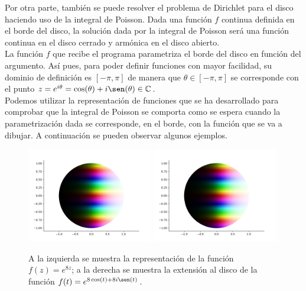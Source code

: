 Por otra parte, también se puede resolver el problema de Dirichlet para el disco haciendo uso de la integral de Poisson. Dada una función $f$ continua definida en el borde del disco, la solución dada por la integral de Poisson será una función continua en el disco cerrado y armónica en el disco abierto. \\

La función $f$ que recibe el programa parametriza el borde del disco en función del argumento. Así pues, para poder definir funciones con mayor facilidad, su dominio de definición es $[-\pi, \pi]$ de manera que $\theta \in [-\pi, \pi]$ se corresponde con el punto $z = e^{i \theta} = \cos(\theta) + i \sen(\theta) \in \complex$. \\

Podemos utilizar la representación de funciones que se ha desarrollado para comprobar que la integral de Poisson se comporta como se espera cuando la parametrización dada se corresponde, en el borde, con la función que se va a dibujar. A continuación se pueden observar algunos ejemplos. \\

\begin{figure}[H]
    \centering
    \includegraphics[width=0.49\textwidth]{../Aplicacion/e^(8z).png}
    \hfill
    \includegraphics[width=0.49\textwidth]{../Aplicacion/e^(8cos(t)+8isen(t)).png}
    \caption{A la izquierda se muestra la representación de la función $f(z) = e^{8z}$; a la derecha se muestra la extensión al disco de la función $f(t) = e^{8 \cos(t)+8i \sen(t)}$.}
    \label{fig:comparacion1}
\end{figure}

